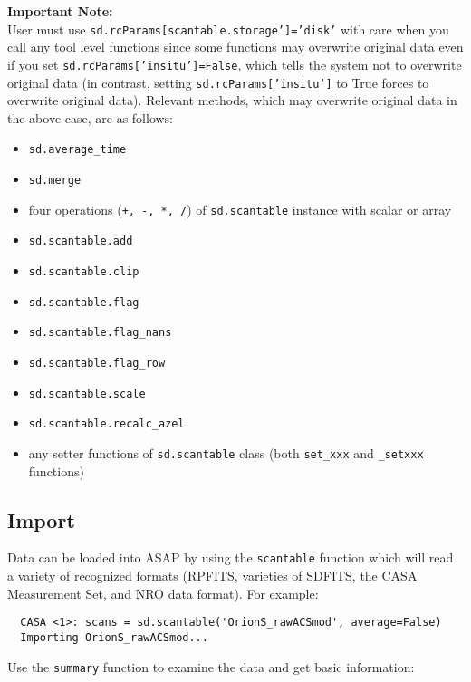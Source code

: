 {\bf Important Note:}\\
User must use {\tt sd.rcParams[scantable.storage']='disk'} with care when 
you call any tool level functions since some functions may overwrite original data 
even if you set {\tt sd.rcParams['insitu']=False}, which tells the system not to 
overwrite original data (in contrast, setting {\tt sd.rcParams['insitu']} to True 
forces to overwrite original data). 
Relevant methods, which may overwrite original data in the above case, are as follows:
\small
\begin{itemize}
   \item {\tt sd.average\_time}
   \item {\tt sd.merge}
   \item four operations ({\tt +, -, *, /}) of {\tt sd.scantable} instance with scalar or array
   \item {\tt sd.scantable.add}
   \item {\tt sd.scantable.clip}
   \item {\tt sd.scantable.flag}
   \item {\tt sd.scantable.flag\_nans}
   \item {\tt sd.scantable.flag\_row}
   \item {\tt sd.scantable.scale}
   \item {\tt sd.scantable.recalc\_azel}
   \item any setter functions of {\tt sd.scantable} class (both {\tt set\_xxx} and {\tt \_setxxx} functions)
\end{itemize}
\normalsize


\subsection{Import}
\label{subsection:sd.asap.import}

Data can be loaded into ASAP by using the {\tt scantable} function
which will read a variety of recognized formats (RPFITS, varieties of
SDFITS, the CASA Measurement Set, and NRO data format). For example:


\small
\begin{verbatim}
  CASA <1>: scans = sd.scantable('OrionS_rawACSmod', average=False)
  Importing OrionS_rawACSmod...
\end{verbatim}
\normalsize

Use the {\tt summary} function to examine the data and get basic information:

